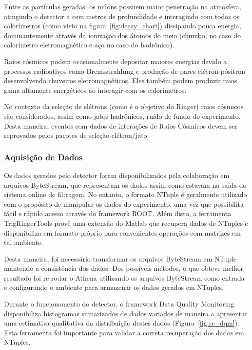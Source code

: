 \documentclass[a4paper,10pt,titlepage]{article}
\begin{document}
Entre as partículas geradas, os múons possuem maior penetração na atmosfera, atingindo o detector a cem metros de profundidade e interagindo com todos os calorímetros (como visto na figura~\ref{fig:decay_chart}) dissipando pouca energia, dominantemente através da ionização dos átomos do meio (chumbo, no caso do calorímetro eletromagnético e aço no caso do hadrônico).

Raios cósmicos podem ocasionalmente depositar maiores energias devido a processos radioativos como Bremsstrahlung e produção de pares elétron-pósitron desenvolvendo chuveiros eletromagnéticos.
Eles também podem produzir raios gama altamente energéticos ao interagir com os calorímetros.

No contexto da seleção de elétrons (como é o objetivo do Ringer) raios cósmicos são considerados, assim como jatos hadrônicos, ruído de fundo do experimento.
Desta maneira, eventos com dados de interações de Raios Cósmicos devem ser reprovados pelos pacotes de seleção elétron/jato.

\subsubsection{Aquisição de Dados}

Os dados gerados pelo detector foram disponibilizados pela colaboração em arquivos ByteStream, que representam os dados assim como estavam na saída do sistema online de filtragem.
No entanto, o formato NTuple é geralmente utilizado com o propósito de manipular os dados do experimento, uma vez que possibilita fácil e rápido acesso através do framework ROOT.
Além disto, a ferramenta TrigRingerTools provê uma extensão do Matlab que recupera dados de NTuples e disponibiliza em formato próprio para convenientes operações com matrizes em tal ambiente.

Desta maneira, foi necessário transformar os arquivos ByteStream em NTuple mantendo a consistência dos dados.
Dos possíveis métodos, o que obteve melhor resultado foi re-rodar o Athena utilizando os arquivos ByteStream como entrada e configurando o ambiente para armazenar os dados gerados em NTuples.

Durante o funcionamento do detector, o framework Data Quality Monitoring disponibiliza histogramas sumarizados de dados variados de maneira a apresentar uma estimativa qualitativa da distribuição destes dados (Figura~\ref{fig:rc_dqm}).
Esta ferramenta foi importante para validar a correta recuperação dos dados em NTuples.
\end{document}
